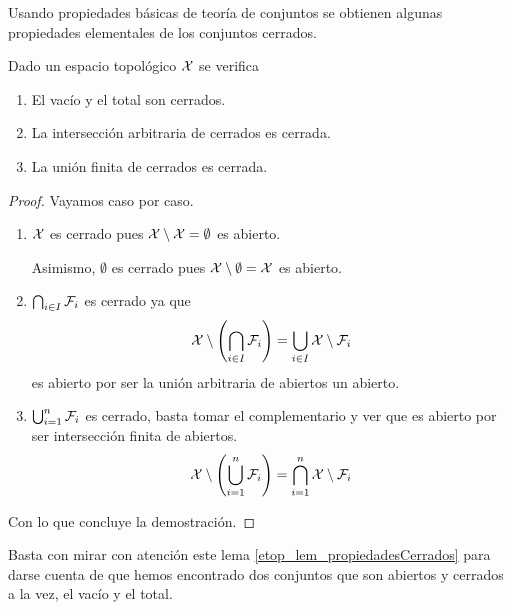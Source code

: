 Usando propiedades básicas de teoría de conjuntos se obtienen algunas propiedades elementales de los conjuntos cerrados.
\begin{lem}
	\label{etop_lem_propiedadesCerrados}
	Dado un espacio topológico $\mathcal{X}$ se verifica
	\begin{enumerate}
		\item El vacío y el total son cerrados.
		\item La intersección arbitraria de cerrados es cerrada.
		\item La unión finita de cerrados es cerrada.
	\end{enumerate}
\end{lem}
\begin{proof}Vayamos caso por caso.
	\begin{enumerate}
		\item $\mathcal{X}$ es cerrado pues $\mathcal{X}\setminus\mathcal{X}=\emptyset$ es abierto.
		
		Asimismo, $\emptyset$ es cerrado pues $\mathcal{X}\setminus\emptyset=\mathcal{X}$ es abierto.
		\item $\bigcap_{i\in I}\mathcal{F}_i$ es cerrado ya que
		\begin{equation*}
		\mathcal{X}\setminus\left(\bigcap_{i\in I}\mathcal{F}_i\right)=\bigcup_{i\in I}\mathcal{X}\setminus\mathcal{F}_i
		\end{equation*}
		es abierto por ser la unión arbitraria de abiertos un abierto.
		\item $\bigcup_{i=1}^n\mathcal{F}_i$ es cerrado, basta tomar el complementario y ver que es abierto por ser intersección finita de abiertos.
		\begin{equation*}
		\mathcal{X}\setminus\left(\bigcup_{i=1}^{n}\mathcal{F}_i\right)=\bigcap_{i=1}^n\mathcal{X}\setminus\mathcal{F}_i
		\end{equation*}
	\end{enumerate}
	Con lo que concluye la demostración.
\end{proof}
\begin{obs}
	\label{etop_obs_abiertoCerrado}
	Basta con mirar con atención este lema \ref{etop_lem_propiedadesCerrados} para darse cuenta de que hemos encontrado dos conjuntos que son abiertos y cerrados a la vez, el vacío y el total.
\end{obs}

